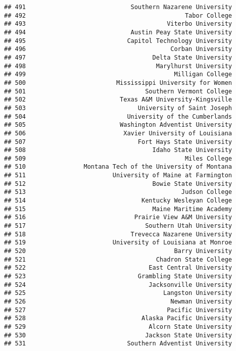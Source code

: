 \documentclass[
]{article}
\begin{document}
\begin{verbatim}
## 491                             Southern Nazarene University
## 492                                            Tabor College
## 493                                       Viterbo University
## 494                             Austin Peay State University
## 495                            Capitol Technology University
## 496                                        Corban University
## 497                                   Delta State University
## 498                                    Marylhurst University
## 499                                         Milligan College
## 500                         Mississippi University for Women
## 501                                 Southern Vermont College
## 502                          Texas A&M University-Kingsville
## 503                               University of Saint Joseph
## 504                            University of the Cumberlands
## 505                          Washington Adventist University
## 506                           Xavier University of Louisiana
## 507                               Fort Hays State University
## 508                                   Idaho State University
## 509                                            Miles College
## 510                Montana Tech of the University of Montana
## 511                        University of Maine at Farmington
## 512                                   Bowie State University
## 513                                           Judson College
## 514                                Kentucky Wesleyan College
## 515                                   Maine Maritime Academy
## 516                              Prairie View A&M University
## 517                                 Southern Utah University
## 518                             Trevecca Nazarene University
## 519                        University of Louisiana at Monroe
## 520                                         Barry University
## 521                                    Chadron State College
## 522                                  East Central University
## 523                               Grambling State University
## 524                                  Jacksonville University
## 525                                      Langston University
## 526                                        Newman University
## 527                                       Pacific University
## 528                                Alaska Pacific University
## 529                                  Alcorn State University
## 530                                 Jackson State University
## 531                            Southern Adventist University

\end{verbatim}
\end{document}
